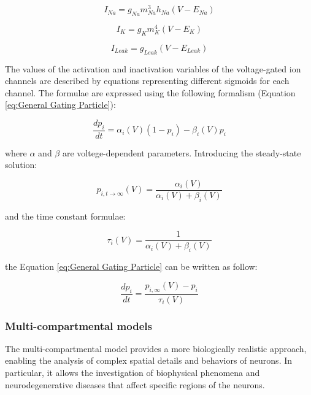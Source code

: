 \begin{equation}
I_{Na} = g_{Na} m^{3}_{Na} h_{Na} (V-E_{Na})
\label{eq:Sodium Ion Current}
\end{equation}

\begin{equation}
I_{K} = g_{K} m^{4}_{K} (V-E_{K})
\label{eq:Potassium Ion Current}
\end{equation}

\begin{equation}
I_{Leak} = g_{Leak} (V-E_{Leak})
\label{eq:Leakage Current}
\end{equation}

The values of the activation and inactivation variables of the voltage-gated ion channels are described by equations representing different sigmoids for each channel. The formulae are expressed using the following formalism (Equation \ref{eq:General Gating Particle}):

\begin{equation}
\frac{dp_{i}}{dt} = \alpha_{i}(V)(1-p_{i})-\beta_{i}(V)p_{i}
\label{eq:General Gating Particle}
\end{equation}

where $\alpha$ and $\beta$ are voltege-dependent parameters. Introducing the steady-state solution: 

\begin{equation}
p_{i, t\to\infty}(V) = \frac{\alpha_{i}(V)}{\alpha_{i}(V)+\beta_{i}(V)}
\label{eq:Steady-state Solution Gating Particle}
\end{equation}

and the time constant formulae:

\begin{equation}
\tau_{i}(V) = \frac{1}{\alpha_{i}(V)+\beta_{i}(V)}
\label{eq:Time Constant Gating Particle}
\end{equation}

the Equation \ref{eq:General Gating Particle} can be written as follow:

\begin{equation}
\frac{dp_{i}}{dt} = \frac{p_{i, \infty}(V)-p_{i}}{\tau_{i}(V)}
\label{eq:Alternative General Gating Particle}
\end{equation}

\subsubsection{Multi-compartmental models}

The multi-compartmental model provides a more biologically realistic approach, enabling the analysis of complex spatial details and behaviors of neurons. In particular, it allows the investigation of biophysical phenomena and neurodegenerative diseases that affect specific regions of the neurons. 

